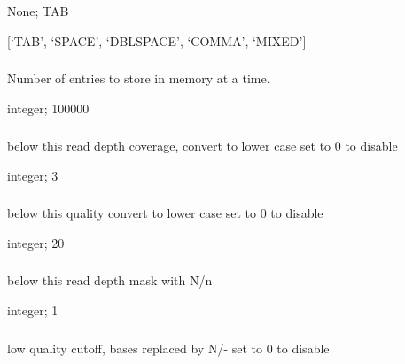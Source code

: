 \documentclass[letterpaper,11pt,english]{sphinxmanual}
\begin{document}
 None;  TAB

 {[}‘TAB’, ‘SPACE’, ‘DBLSPACE’, ‘COMMA’, ‘MIXED’{]}


\subsubsection{}
\label{\detokenize{prog_desc:id35}}
 Number of entries to store in memory at a time.

 integer;  100000


\subsubsection{}
\label{\detokenize{prog_desc:lowdepth}}
 below this read depth coverage, convert to lower case set to 0 to disable

 integer;  3


\subsubsection{}
\label{\detokenize{prog_desc:lowqual}}
 below this quality convert to lower case set to 0 to disable

 integer;  20


\subsubsection{}
\label{\detokenize{prog_desc:maskdepth}}
 below this read depth mask with N/n

 integer;  1


\subsubsection{}
\label{\detokenize{prog_desc:maskqual}}
 low quality cutoff, bases replaced by N/- set to 0 to disable
\end{document}
